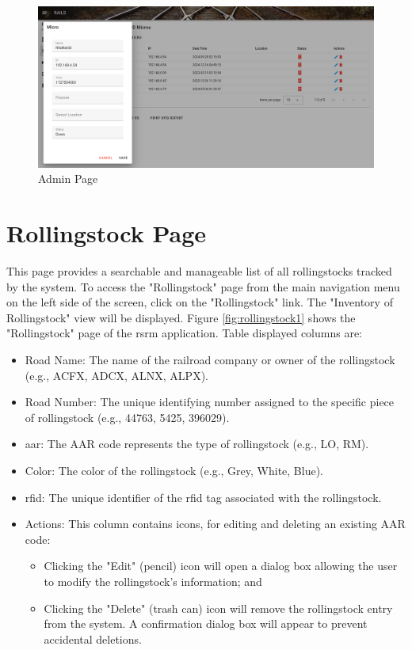 \begin{figure}[H]
    \centering
    \includegraphics[scale=0.33]{./images/admin-micro-edit.png}
    \caption{Admin Page}
    \label{fig:admin3}
\end{figure}

\section{Rollingstock Page}
This page provides a searchable and manageable list of all rollingstocks tracked by the system. To access the "Rollingstock" page 
from the main navigation menu on the left side of the screen, click on the "Rollingstock" link. The "Inventory of Rollingstock" view will be displayed.
Figure \ref{fig:rollingstock1} shows the "Rollingstock" page of the \gls{rsrm} application. Table displayed columns are:
\begin{itemize}
    \item Road Name: The name of the railroad company or owner of the rollingstock (e.g., ACFX, ADCX, ALNX, ALPX).
    \item Road Number: The unique identifying number assigned to the specific piece of rollingstock (e.g., 44763, 5425, 396029).
    \item \gls{aar}: The AAR code represents the type of rollingstock (e.g., LO, RM).
    \item Color: The color of the rollingstock (e.g., Grey, White, Blue).
    \item \gls{rfid}: The unique identifier of the \gls{rfid} tag associated with the rollingstock.
    \item Actions: This column contains icons, for editing and deleting an existing AAR code:
    \begin{itemize}
        \item Clicking the "Edit" (pencil) icon will open a dialog box allowing the user to modify the rollingstock's information; and
        \item Clicking the "Delete" (trash can) icon will remove the rollingstock entry from the system. A confirmation dialog box will 
        appear to prevent accidental deletions.
    \end{itemize}
\end{itemize}

